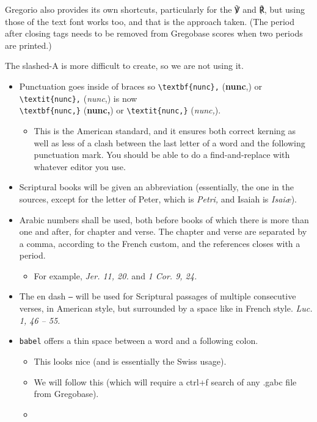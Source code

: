 \documentclass[11pt]{article}
\begin{document}
Gregorio also provides its own shortcuts, particularly for the ℣ and ℟, but using those of the text font works too, and that is the approach taken. (The period after closing tags needs to be removed from Gregobase scores when two periods are printed.)

The slashed-A is more difficult to create, so we are not using it.

\begin{itemize}
\item
 Punctuation goes inside of braces so \verb|\textbf{nunc},| (\textbf{nunc},) or \verb|\textit{nunc},| (\textit{nunc},) is now\\ \verb|\textbf{nunc,}| (\textbf{nunc,}) or \verb|\textit{nunc,}| (\textit{nunc,}).
 \begin{itemize}
 \item
 This is the American standard, and it ensures both correct kerning as well as less of a clash between the last letter of a word and the following punctuation mark. You should be able to do a find-and-replace with whatever editor you use.
 \end{itemize}
 \item
Scriptural books will be given an abbreviation (essentially, the one in the sources, except for the letter of Peter, which is \textit{Petri,} and Isaiah is \textit{Isaiæ}).
\item
Arabic numbers shall be used, both before books of which there is more than one and after, for chapter and verse. The chapter and verse are separated by a comma, according to the French custom, and the references closes with a period.
 \begin{itemize}
\item
 For example, \hspace{0.05em}\textit{Jer. 11, 20.} and \textit{1 Cor. 9, 24.}\end{itemize}
 \item
The en dash \verb|–| will be used for Scriptural passages of multiple consecutive verses, in American style, but surrounded by a space like in French style. \textit{Luc. 1, 46 – 55.}
\item
\verb|babel| offers a thin space between a word and a following colon.
 \begin{itemize}
 \item
 This looks nice (and is essentially the Swiss usage).
 \item
 We will follow this (which will require a ctrl+f search of any .gabc file from Gregobase).
 \item

\end{itemize}
\end{itemize}
\end{document}
